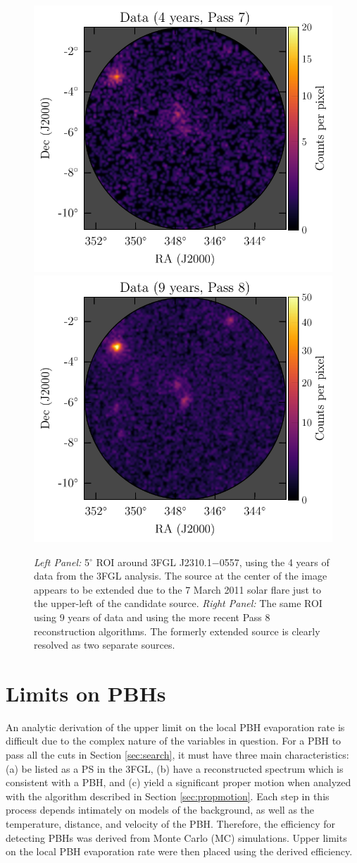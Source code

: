\begin{figure}
\begin{center}
\includegraphics[width=0.45\columnwidth]{figures/3fgl_overlay.pdf}
\includegraphics[width=0.45\columnwidth]{figures/4fgl_overlay.pdf}
\caption{
\label{fig:j2310}
{\it Left Panel:} 5$^\circ$ ROI around 3FGL J2310.1$-$0557, using the 4 years of data from the 3FGL analysis. The source at the center of the image appears to be extended due to the 7 March 2011 solar flare just to the upper-left of the candidate source.
{\it Right Panel:} The same ROI using 9 years of data and using the more recent Pass 8 reconstruction algorithms. The formerly extended source is clearly resolved as two separate sources.
}
\end{center}
\end{figure}
\section{Limits on PBH\MakeLowercase{s}}
\label{sec:MClimit}

An analytic derivation of the upper limit on the local PBH evaporation rate is difficult due to the complex nature of the variables in question.
For a PBH to pass all the cuts in Section \ref{sec:search}, it must have three main characteristics: (a) be listed as a PS in the 3FGL, (b) have a reconstructed spectrum which is consistent with a PBH, and (c) yield a significant proper motion when analyzed with the algorithm described in Section \ref{sec:propmotion}.
Each step in this process depends intimately on models of the background, as well as the temperature, distance, and velocity of the PBH.
Therefore, the efficiency for detecting PBHs was derived from Monte Carlo (MC) simulations.
Upper limits on the local PBH evaporation rate were then placed using the derived efficiency.

